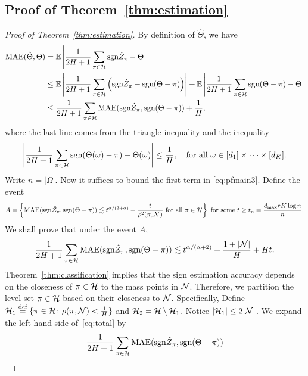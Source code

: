 \documentclass[11pt]{article}
\theoremstyle{plain}
\theoremstyle{definition}
\def\sign{\textup{sgn}}
\begin{document}
\subsection{Proof of Theorem~\ref{thm:estimation}}
\begin{proof}[Proof of Theorem~\ref{thm:estimation}]
By definition of $\hat\Theta$, we have
\begin{align}\label{eq:pfmain3}\nonumber
\text{MAE}(\hat\Theta,\Theta) &= \mathbb{E}\left|\frac{1}{2H+1}\sum_{\pi\in\tH}\sign\hat Z_\pi-\Theta\right|\\\nonumber
&\leq \mathbb{E}\left|\frac{1}{2H+1}\sum_{\pi\in\tH}\left(\sign\hat Z_\pi-\sign(\Theta-\pi)\right)\right|+\mathbb{E}\left|\frac{1}{2H+1}\sum_{\pi\in\tH}\sign(\Theta-\pi)-\Theta\right|\\&
\leq \frac{1}{2H+1}\sum_{\pi\in\tH}\text{MAE}(\sign\hat Z_\pi,\sign(\Theta-\pi))+\frac{1}{H},
\end{align}
where the last line comes  from the triangle inequality and the inequality
\begin{equation}
\left|\frac{1}{2H+1}\sum_{\pi\in\tH}\sign(\Theta(\omega)-\pi)-\Theta(\omega)\right|\leq \frac{1}{H},\quad\text{for all } \omega\in[d_1]\times\cdots\times[d_K] .
\end{equation}
Write $n=|\Omega|$. Now it suffices to bound  the first term in \eqref{eq:pfmain3}.  
Define the event 
\begin{align}
A = \left\{\text{MAE}(\sign \hat \tZ_\pi,\sign(\Theta-\pi))\lesssim t^{\alpha/(2+\alpha)}+ \frac{t}{\rho^2(\pi,\tN)}\text{ for all } \pi\in\tH\right\} \text{ for some } t\geq t_n={d_{\max}rK\log n \over n}.
\end{align}
We shall prove that under the event $A$,
\begin{equation}\label{eq:total}
{1\over 2H+1}\sum_{\pi \in \tH} \textup{MAE}(\sign \hat Z_\pi, \sign (\Theta-\pi)) \lesssim  t^{\alpha/(\alpha+2)}+{1+|\tN|\over H}+ H t.
\end{equation}
Theorem~\ref{thm:classification} implies that the  sign estimation accuracy depends on the closeness of $\pi\in \mathcal{H}$ to the mass points in $\mathcal{N}$. Therefore, we partition the level set $\pi \in \mathcal{H}$ based on their closeness to $\mathcal{N}$. Specifically, Define $\mathcal{H}_1 \stackrel{\text{def}}{=}\{\pi\in\mathcal{H}\colon \rho(\pi,\mathcal{N})<\frac{1}{H}\}$ and $\mathcal{H}_2 = \mathcal{H}\setminus\mathcal{H}_1$.   Notice $|\mathcal{H}_1|\leq 2|\mathcal{N}|$.  We expand the left hand side of~\eqref{eq:total} by
\begin{align}\label{eq:twobounds}
&{1\over 2H+1}\sum_{\pi \in \tH} \textup{MAE}(\sign \hat Z_\pi, \sign (\Theta-\pi))\notag \\

\end{align}
\end{proof}
\end{document}
